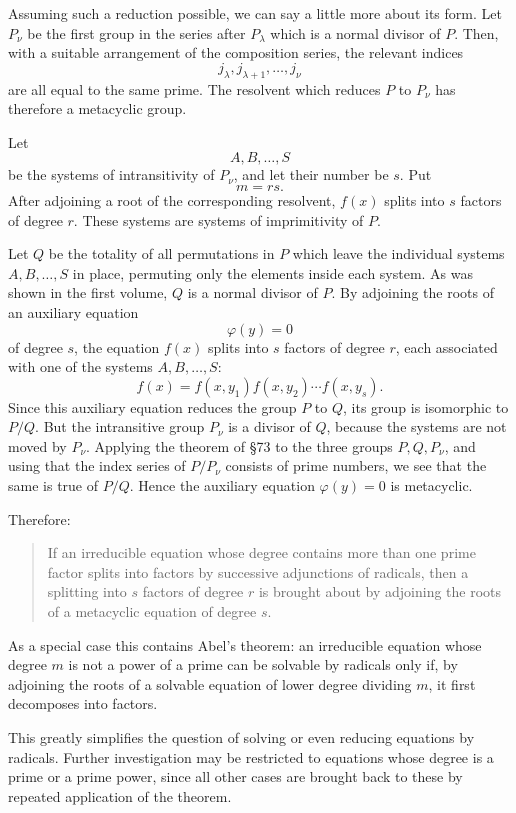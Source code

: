 \documentclass[12pt,a4paper]{article}
\begin{document}
Assuming such a reduction possible, we can say a little more about its form.  Let \(P_\nu\) be the first group in the series after \(P_\lambda\) which is a normal divisor of \(P\).  Then, with a suitable arrangement of the composition series, the relevant indices
\[
 j_\lambda,j_{\lambda+1},\ldots,j_\nu
\]
are all equal to the same prime.  The resolvent which reduces \(P\) to \(P_\nu\) has therefore a metacyclic group.

Let
\[
 A,B,\ldots,S
\]
be the systems of intransitivity of \(P_\nu\), and let their number be \(s\).  Put
\[
 m=rs.
\]
After adjoining a root of the corresponding resolvent, \(f(x)\) splits into \(s\) factors of degree \(r\).  These systems are systems of imprimitivity of \(P\).

Let \(Q\) be the totality of all permutations in \(P\) which leave the individual systems \(A,B,\ldots,S\) in place, permuting only the elements inside each system.  As was shown in the first volume, \(Q\) is a normal divisor of \(P\).  By adjoining the roots of an auxiliary equation
\[
 \varphi(y)=0
\]
of degree \(s\), the equation \(f(x)\) splits into \(s\) factors of degree \(r\), each associated with one of the systems \(A,B,\ldots,S\):
\[
 f(x)=f(x,y_1)f(x,y_2)\cdots f(x,y_s).
\]
Since this auxiliary equation reduces the group \(P\) to \(Q\), its group is isomorphic to \(P/Q\).  But the intransitive group \(P_\nu\) is a divisor of \(Q\), because the systems are not moved by \(P_\nu\).  Applying the theorem of \S 73 to the three groups \(P,Q,P_\nu\), and using that the index series of \(P/P_\nu\) consists of prime numbers, we see that the same is true of \(P/Q\).  Hence the auxiliary equation \(\varphi(y)=0\) is metacyclic.

Therefore:

\begin{quote}
If an irreducible equation whose degree contains more than one prime factor splits into factors by successive adjunctions of radicals, then a splitting into \(s\) factors of degree \(r\) is brought about by adjoining the roots of a metacyclic equation of degree \(s\).
\end{quote}

As a special case this contains Abel's theorem: an irreducible equation whose degree \(m\) is not a power of a prime can be solvable by radicals only if, by adjoining the roots of a solvable equation of lower degree dividing \(m\), it first decomposes into factors.

This greatly simplifies the question of solving or even reducing equations by radicals.  Further investigation may be restricted to equations whose degree is a prime or a prime power, since all other cases are brought back to these by repeated application of the theorem.
\end{document}
